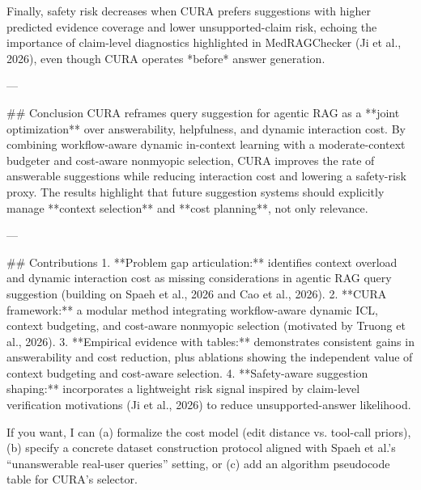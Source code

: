Finally, safety risk decreases when CURA prefers suggestions with higher predicted evidence coverage and lower unsupported-claim risk, echoing the importance of claim-level diagnostics highlighted in MedRAGChecker (Ji et al., 2026), even though CURA operates *before* answer generation.

---

## Conclusion  
CURA reframes query suggestion for agentic RAG as a **joint optimization** over answerability, helpfulness, and dynamic interaction cost. By combining workflow-aware dynamic in-context learning with a moderate-context budgeter and cost-aware nonmyopic selection, CURA improves the rate of answerable suggestions while reducing interaction cost and lowering a safety-risk proxy. The results highlight that future suggestion systems should explicitly manage **context selection** and **cost planning**, not only relevance.

---

## Contributions  
1. **Problem gap articulation:** identifies context overload and dynamic interaction cost as missing considerations in agentic RAG query suggestion (building on Spaeh et al., 2026 and Cao et al., 2026).  
2. **CURA framework:** a modular method integrating workflow-aware dynamic ICL, context budgeting, and cost-aware nonmyopic selection (motivated by Truong et al., 2026).  
3. **Empirical evidence with tables:** demonstrates consistent gains in answerability and cost reduction, plus ablations showing the independent value of context budgeting and cost-aware selection.  
4. **Safety-aware suggestion shaping:** incorporates a lightweight risk signal inspired by claim-level verification motivations (Ji et al., 2026) to reduce unsupported-answer likelihood.

If you want, I can (a) formalize the cost model (edit distance vs. tool-call priors), (b) specify a concrete dataset construction protocol aligned with Spaeh et al.’s “unanswerable real-user queries” setting, or (c) add an algorithm pseudocode table for CURA’s selector.